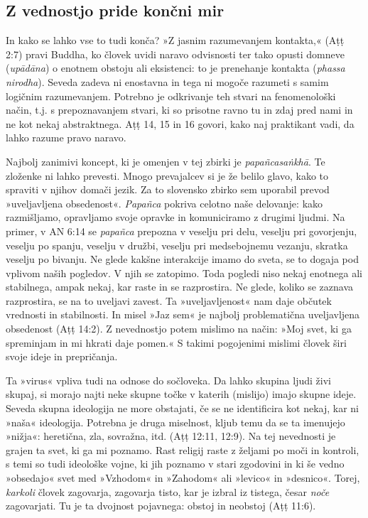 \subsection{Z vednostjo pride končni mir}

In kako se lahko vse to tudi konča? »Z jasnim razumevanjem kontakta,«
(Aṭṭ 2:7) pravi Buddha, ko človek uvidi naravo odvisnosti ter tako
opusti domneve (\emph{upādāna}) o enotnem obstoju ali eksistenci: to je
prenehanje kontakta (\emph{phassa nirodha}). Seveda zadeva ni enostavna
in tega ni mogoče razumeti s samim logičnim razumevanjem. Potrebno je
odkrivanje teh stvari na fenomenološki način, t.j. s prepoznavanjem
stvari, ki so prisotne ravno tu in zdaj pred nami in ne kot nekaj
abstraktnega. Aṭṭ 14, 15 in 16 govori, kako naj praktikant vadi, da
lahko razume pravo naravo.

Najbolj zanimivi koncept, ki je omenjen v tej zbirki je
\emph{papañcasaṅkhā}. Te zloženke ni lahko prevesti. Mnogo prevajalcev
si je že belilo glavo, kako to spraviti v njihov domači jezik. Za to
slovensko zbirko sem uporabil prevod »uveljavljena obsedenost«.
\emph{Papañca} pokriva celotno naše delovanje: kako razmišljamo,
opravljamo svoje opravke in komuniciramo z drugimi ljudmi. Na primer, v
AN 6:14 se \emph{papañca} prepozna v veselju pri delu, veselju pri
govorjenju, veselju po spanju, veselju v družbi, veselju pri
medsebojnemu vezanju, skratka veselju po bivanju. Ne glede kakšne
interakcije imamo do sveta, se to dogaja pod vplivom naših pogledov. V
njih se zatopimo. Toda pogledi niso nekaj enotnega ali stabilnega, ampak
nekaj, kar raste in se razprostira. Ne glede, koliko se zaznava
razprostira, se na to uveljavi zavest. Ta »uveljavljenost« nam daje
občutek vrednosti in stabilnosti. In misel »Jaz sem« je najbolj
problematična uveljavljena obsedenost (Aṭṭ 14:2). Z nevednostjo potem
mislimo na način: »Moj svet, ki ga spreminjam in mi hkrati daje pomen.«
S takimi pogojenimi mislimi človek širi svoje ideje in prepričanja.

Ta »virus« vpliva tudi na odnose do sočloveka. Da lahko skupina ljudi
živi skupaj, si morajo najti neke skupne točke v katerih (mislijo) imajo
skupne ideje. Seveda skupna ideologija ne more obstajati, če se ne
identificira kot nekaj, kar ni »naša« ideologija. Potrebna je druga
miselnost, kljub temu da se ta imenujejo »nižja«: heretična, zla,
sovražna, itd. (Aṭṭ 12:11, 12:9). Na tej nevednosti je grajen ta svet,
ki ga mi poznamo. Rast religij raste z željami po moči in kontroli, s
temi so tudi ideološke vojne, ki jih poznamo v stari zgodovini in ki še
vedno »obsedajo« svet med »Vzhodom« in »Zahodom« ali »levico« in
»desnico«. Torej, \emph{karkoli} človek zagovarja, zagovarja tisto, kar
je izbral iz tistega, česar \emph{noče} zagovarjati. Tu je ta dvojnost
pojavnega: obstoj in neobstoj (Aṭṭ 11:6).


